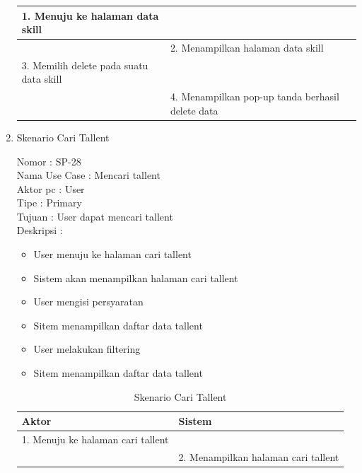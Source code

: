 \begin{enumerate}
\begin{table}
\begin{tabular}{ | l | p{60mm}|}
		1.	Menuju ke halaman data skill &  \\
		
		\hline
		
		&  2.	Menampilkan halaman data skill \\
		
		\hline
		
		3. Memilih delete pada suatu data skill & \\
		
		\hline
		
		& 4.	Menampilkan pop-up tanda berhasil delete data \\
		\hline
		
	\end{tabular}
\end{table}

\newpage
\item Skenario Cari Tallent

Nomor \kern 3.6pc : SP-28 \\
Nama Use Case : Mencari tallent \\
Aktor  pc : User \\
Tipe \kern 4.6pc : Primary \\
Tujuan \kern 3.6pc : User dapat mencari tallent \\
Deskripsi \kern 2.5pc : 

\begin{itemize}
	\item User menuju ke halaman cari tallent
	\item Sistem akan menampilkan halaman cari tallent
	\item User mengisi persyaratan
	\item Sitem menampilkan daftar data tallent
	\item User melakukan filtering
	\item Sitem menampilkan daftar data tallent
	
\end{itemize}

\begin{table}
	\caption{Skenario Cari Tallent}
	\centering
	\begin{tabular}{ | l | p{60mm}|}
		\hline 
		\textbf{Aktor} & \textbf{Sistem} \\
		\hline
		
		1.	Menuju ke halaman cari tallent &  \\
		
		\hline
		
		&  2.	Menampilkan halaman cari tallent \\
		

\end{tabular}
\end{table}
\end{enumerate}
